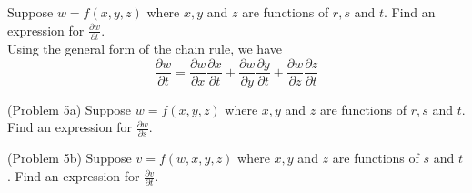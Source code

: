 \documentclass[handout]{ximera}
\begin{document}
\begin{example}[Example 5]
Suppose $w = f(x, y, z)$ where $x, y$ and $z$ are functions of $r, s$ and $t$. Find an expression for $\frac{\partial w}{\partial t}$.\\
Using the general form of the chain rule, we have
\[
\frac{\partial w}{\partial t}= \frac{\partial w}{\partial x}\frac{\partial x}{\partial t}+\frac{\partial w}{\partial y}\frac{\partial y}{\partial t}
+\frac{\partial w}{\partial z}\frac{\partial z}{\partial t}
\]
\end{example}

\begin{problem}(Problem 5a)
Suppose $w = f(x, y, z)$ where $x, y$ and $z$ are functions of $r, s$ and $t$. Find an expression for $\frac{\partial w}{\partial s}$.
\end{problem}

\begin{problem}(Problem 5b)
Suppose $v = f(w, x, y, z)$ where $x, y$ and $z$ are functions of $s$ and $t$. Find an expression for $\frac{\partial v}{\partial t}$.
\end{problem}
\end{document}
